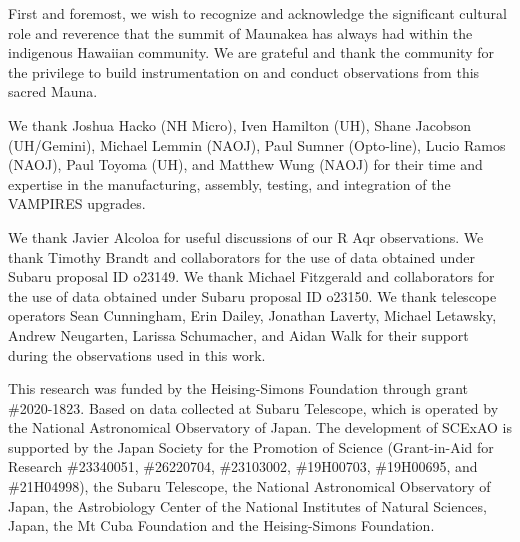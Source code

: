 \begin{acknowledgements}

First and foremost, we wish to recognize and acknowledge the significant cultural role and reverence that the summit of Maunakea has always had within the indigenous Hawaiian community. We are grateful and thank the community for the privilege to build instrumentation on and conduct observations from this sacred Mauna.

We thank Joshua Hacko (NH Micro), Iven Hamilton (UH), Shane Jacobson (UH/Gemini), Michael Lemmin (NAOJ), Paul Sumner (Opto-line), Lucio Ramos (NAOJ), Paul Toyoma (UH), and Matthew Wung (NAOJ) for their time and expertise in the manufacturing, assembly, testing, and integration of the VAMPIRES upgrades.


We thank Javier Alcoloa for useful discussions of our R Aqr observations. We thank Timothy Brandt and collaborators for the use of data obtained under Subaru proposal ID o23149. We thank Michael Fitzgerald and collaborators for the use of data obtained under Subaru proposal ID o23150. We thank telescope operators Sean Cunningham, Erin Dailey, Jonathan Laverty, Michael Letawsky, Andrew Neugarten, Larissa Schumacher, and Aidan Walk for their support during the observations used in this work.

This research was funded by the Heising-Simons Foundation through grant \#2020-1823. Based on data collected at Subaru Telescope, which is operated by the National Astronomical Observatory of Japan. The development of SCExAO is supported by the Japan Society for the Promotion of Science (Grant-in-Aid for Research \#23340051, \#26220704, \#23103002, \#19H00703, \#19H00695, and \#21H04998), the Subaru Telescope, the National Astronomical Observatory of Japan, the Astrobiology Center of the National Institutes of Natural Sciences, Japan, the Mt Cuba Foundation and the Heising-Simons Foundation.
\end{acknowledgements}